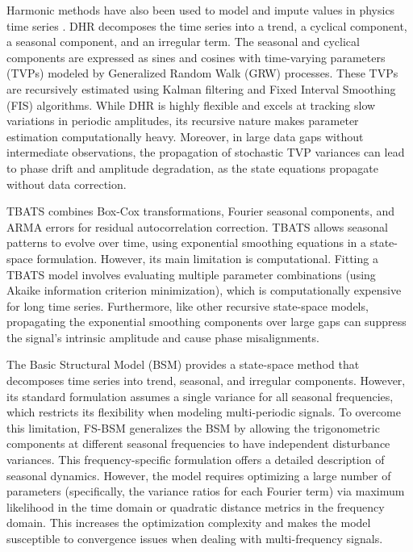 \documentclass[a4paper,fleqn]{cas-sc}
\begin{document}
Harmonic methods have also been used to model and impute values in physics time series \cite{zavala2016dynamic,mindham2019dynamic,gonccalves2020temperature}. DHR \cite{young1999dynamic} decomposes the time series into a trend, a cyclical component, a seasonal component, and an irregular term. The seasonal and cyclical components are expressed as sines and cosines with time-varying parameters (TVPs) modeled by Generalized Random Walk (GRW) processes. These TVPs are recursively estimated using Kalman filtering and Fixed Interval Smoothing (FIS) algorithms. While DHR is highly flexible and excels at tracking slow variations in periodic amplitudes, its recursive nature makes parameter estimation computationally heavy. Moreover, in large data gaps without intermediate observations, the propagation of stochastic TVP variances can lead to phase drift and amplitude degradation, as the state equations propagate without data correction.

TBATS \cite{de2011forecasting} combines Box-Cox transformations, Fourier seasonal components, and ARMA errors for residual autocorrelation correction. TBATS allows seasonal patterns to evolve over time, using exponential smoothing equations in a state-space formulation. However, its main limitation is computational. Fitting a TBATS model involves evaluating multiple parameter combinations (using Akaike information criterion minimization), which is computationally expensive for long time series. Furthermore, like other recursive state-space models, propagating the exponential smoothing components over large gaps can suppress the signal's intrinsic amplitude and cause phase misalignments.


The Basic Structural Model (BSM) \cite{harvey1990forecasting} provides a state-space method that decomposes time series into trend, seasonal, and irregular components. However, its standard formulation assumes a single variance for all seasonal frequencies, which restricts its flexibility when modeling multi-periodic signals. To overcome this limitation, FS-BSM \cite{hindrayanto2013modelling} generalizes the BSM by allowing the trigonometric components at different seasonal frequencies to have independent disturbance variances. This frequency-specific formulation offers a detailed description of seasonal dynamics. However, the model requires optimizing a large number of parameters (specifically, the variance ratios for each Fourier term) via maximum likelihood in the time domain or quadratic distance metrics in the frequency domain. This increases the optimization complexity and makes the model susceptible to convergence issues when dealing with multi-frequency signals.
\end{document}
